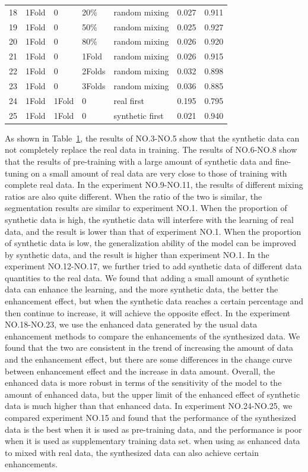 \documentclass[letterpaper]{article} %
\begin{document}
\begin{table}[t]
{\begin{tabular}{lllllll}
			18& 1Fold 	 &0 		&  20\%	 	&random mixing &0.027 &0.911 \\
			19& 1Fold 	 &0 		&  50\% 	&random mixing &0.025 &0.927 \\
			20& 1Fold    &0 		&  80\% 	&random mixing &0.026 &0.920 \\
			21& 1Fold 	 &0 		&  1Fold    &random mixing &0.026 &0.915 \\
			22& 1Fold 	 &0 		&  2Folds   &random mixing &0.032 &0.898 \\
			23& 1Fold 	 &0 		&  3Folds   &random mixing &0.036 &0.885 \\			
			24& 1Fold 	 & 1Fold 	&0  		&real first &0.195 &0.795 \\
			25& 1Fold 	 & 1Fold 	&0  		&synthetic first &0.021 &0.940 \\
			\bottomrule
		\end{tabular}
	}
	\label{availability_test}
\end{table}

As shown in Table~\ref{availability_test}, the results of NO.3-NO.5 show that the synthetic data can not completely replace the real data in training.            
The results of NO.6-NO.8 show that the results of pre-training with a large amount of synthetic data and fine-tuning on a small amount of real data are very close to those of training with complete real data.   
In the experiment NO.9-NO.11, the results of different mixing ratios are also quite different. When the ratio of the two is similar, the segmentation results are similar to experiment NO.1. When the proportion of synthetic data is high, the synthetic data will interfere with the learning of real data, and the result is lower than that of experiment NO.1. When the proportion of synthetic data is low, the generalization ability of the model can be improved by synthetic data, and the result is higher than experiment NO.1.            
In the experiment NO.12-NO.17, we further tried to add synthetic data of different data quantities to the real data. We found that adding a small amount of synthetic data can enhance the learning, and the more synthetic data, the better the enhancement effect, but when the synthetic data reaches a certain percentage and then continue to increase, it will achieve the opposite effect.  
In the experiment NO.18-NO.23, we use the enhanced data generated by the usual data enhancement methods to compare the enhancements of the synthesized data. We found that the two are consistent in the trend of increasing the amount of data and the enhancement effect, but there are some differences in  the change curve between  enhancement effect and the increase in data amount. Overall, the enhanced data is more robust in terms of the sensitivity of the model to the amount of enhanced data, but the upper limit of the enhanced effect of synthetic data is much higher than that enhanced data.   
In experiment NO.24-NO.25, we compared experiment NO.15 and found that the performance of the synthesized data is the best when it is used as pre-training data, and the performance is poor when it is used as supplementary training data set. when using as enhanced data to mixed with real data, the synthesized data can also achieve certain enhancements.
\end{document}
